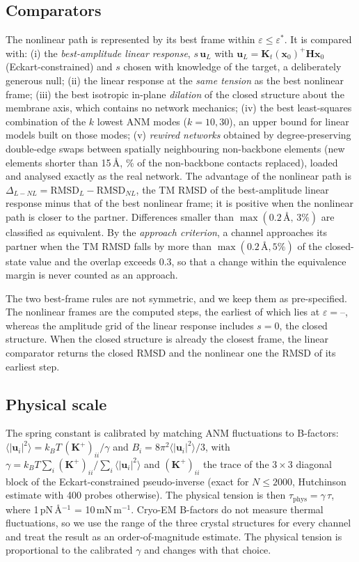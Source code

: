 \documentclass[preprint,12pt,a4paper]{elsarticle}
\newcommand{\x}{\mathbf{x}}
\newcommand{\Kt}{\mathbf{K}_t}
\newcommand{\Hm}{\mathbf{H}}
\newcommand{\eps}{\varepsilon}
\begin{document}
\subsection{Comparators}
\label{sec:nulls}
The nonlinear path is represented by its best frame within $\eps\le\eps^*$. It is compared with:
(i) the \emph{best-amplitude linear response}, $s\,\mathbf{u}_L$ with $\mathbf{u}_L=\Kt(\x_0)^{+}\Hm\x_0$ (Eckart-constrained) and $s$ chosen with knowledge of the target, a deliberately generous null;
(ii) the linear response at the \emph{same tension} as the best nonlinear frame;
(iii) the best isotropic in-plane \emph{dilation} of the closed structure about the membrane axis, which contains no network mechanics;
(iv) the best least-squares combination of the $k$ lowest ANM modes ($k=10,30$), an upper bound for linear models built on those modes;
(v)  \emph{rewired networks} obtained by degree-preserving double-edge swaps between spatially neighbouring non-backbone elements (new elements shorter than 15\,\AA, \% of the non-backbone contacts replaced), loaded and analysed exactly as the real network.
The advantage of the nonlinear path is $\Delta_{L-NL}=\mathrm{RMSD}_L-\mathrm{RMSD}_{NL}$, the TM RMSD of the best-amplitude linear response minus that of the best nonlinear frame; it is positive when the nonlinear path is closer to the partner. Differences smaller than $\max(0.2\,\text{\AA},\,3\%)$ are classified as equivalent. By the \emph{approach criterion}, a channel approaches its partner when the TM RMSD falls by more than $\max(0.2\,\text{\AA},5\%)$ of the closed-state value and the overlap exceeds 0.3, so that a change within the equivalence margin is never counted as an approach.

The two best-frame rules are not symmetric, and we keep them as pre-specified. The nonlinear frames are the computed steps, the earliest of which lies at $\eps=$--, whereas the amplitude grid of the linear response includes $s=0$, the closed structure. When the closed structure is already the closest frame, the linear comparator returns the closed RMSD and the nonlinear one the RMSD of its earliest step.

\subsection{Physical scale}
\label{sec:phys}
The spring constant is calibrated by matching ANM fluctuations to B-factors: $\langle|\mathbf{u}_i|^2\rangle=k_BT\,(\mathbf{K}^+)_{ii}/\gamma$ and $B_i=8\pi^2\langle|\mathbf{u}_i|^2\rangle/3$, with $\gamma=k_BT\sum_i(\mathbf{K}^+)_{ii}/\sum_i\langle|\mathbf{u}_i|^2\rangle$ and $(\mathbf{K}^+)_{ii}$ the trace of the $3\times3$ diagonal block of the Eckart-constrained pseudo-inverse (exact for $N\le2000$, Hutchinson estimate with 400 probes otherwise). The physical tension is then $\tau_{\mathrm{phys}}=\gamma\,\tau$, where 1\,pN\,\AA$^{-1}$ = 10\,mN\,m$^{-1}$. Cryo-EM B-factors do not measure thermal fluctuations, so we use the range of the three crystal structures for every channel and treat the result as an order-of-magnitude estimate. The physical tension is proportional to the calibrated $\gamma$ and changes with that choice.
\end{document}
